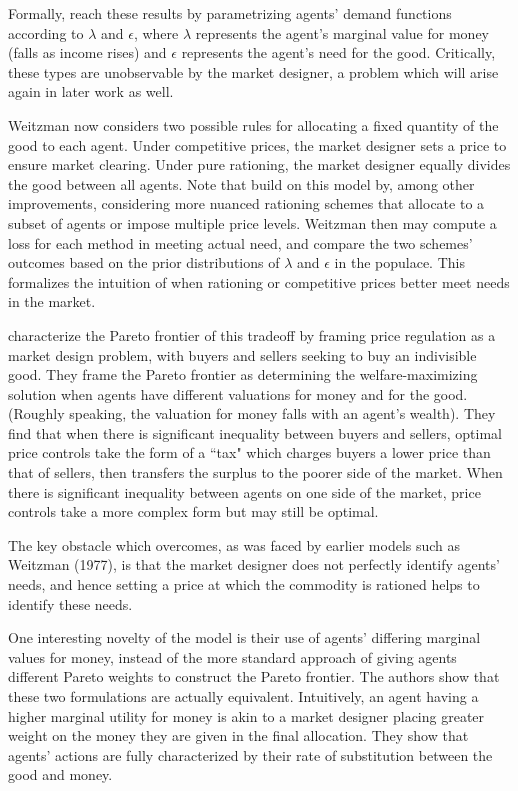 \documentclass[JEL]{AEA}
\begin{document}
Formally, \cite{weitzman-1977} reach these results by parametrizing agents' demand functions according to $\lambda$ and $\epsilon$, where $\lambda$ represents the agent's marginal value for money (falls as income rises) and $\epsilon$ represents the agent's need for the good. Critically, these types are unobservable by the market designer, a problem which will arise again in later work as well.

Weitzman now considers two possible rules for allocating a fixed quantity of the good to each agent. Under competitive prices, the market designer sets a price to ensure market clearing. Under pure rationing, the market designer equally divides the good between all agents. Note that \cite{dworczak-2020} build on this model by, among other improvements, considering more nuanced rationing schemes that allocate to a subset of agents or impose multiple price levels. Weitzman then may compute a loss for each method in meeting actual need, and compare the two schemes' outcomes based on the prior distributions of $\lambda$ and $\epsilon$ in the populace. This formalizes the intuition of when rationing or competitive prices better meet needs in the market.

\cite{dworczak-2020} characterize the Pareto frontier of this tradeoff by framing price regulation as a market design problem, with buyers and sellers seeking to buy an indivisible good. They frame the Pareto frontier as determining the welfare-maximizing solution when agents have different valuations for money and for the good. (Roughly speaking, the valuation for money falls with an agent's wealth). They find that when there is significant inequality between buyers and sellers, optimal price controls take the form of a ``tax" which charges buyers a lower price than that of sellers, then transfers the surplus to the poorer side of the market. When there is significant inequality between agents on one side of the market, price controls take a more complex form but may still be optimal.

The key obstacle which \cite{dworczak-2020} overcomes, as was faced by earlier models such as Weitzman (1977), is that the market designer does not perfectly identify agents' needs, and hence setting a price at which the commodity is rationed helps to identify these needs.

One interesting novelty of the \cite{dworczak-2020} model is their use of agents' differing marginal values for money, instead of the more standard approach of giving agents different Pareto weights to construct the Pareto frontier. The authors show that these two formulations are actually equivalent. Intuitively, an agent having a higher marginal utility for money is akin to a market designer placing greater weight on the money they are given in the final allocation. They show that agents' actions are fully characterized by their rate of substitution between the good and money.
\end{document}
